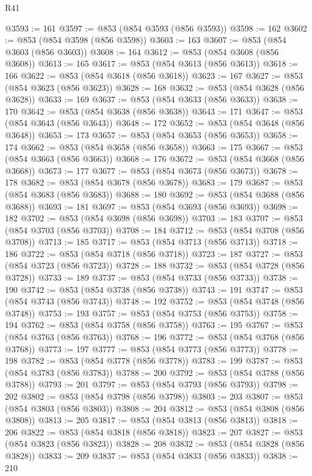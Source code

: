 \begin{lexlean}{R41}
\begin{coremodule}
@3593 := 161
@3597 := @853 (@854 @3593 (@856 @3593))
@3598 := 162
@3602 := @853 (@854 @3598 (@856 @3598))
@3603 := 163
@3607 := @853 (@854 @3603 (@856 @3603))
@3608 := 164
@3612 := @853 (@854 @3608 (@856 @3608))
@3613 := 165
@3617 := @853 (@854 @3613 (@856 @3613))
@3618 := 166
@3622 := @853 (@854 @3618 (@856 @3618))
@3623 := 167
@3627 := @853 (@854 @3623 (@856 @3623))
@3628 := 168
@3632 := @853 (@854 @3628 (@856 @3628))
@3633 := 169
@3637 := @853 (@854 @3633 (@856 @3633))
@3638 := 170
@3642 := @853 (@854 @3638 (@856 @3638))
@3643 := 171
@3647 := @853 (@854 @3643 (@856 @3643))
@3648 := 172
@3652 := @853 (@854 @3648 (@856 @3648))
@3653 := 173
@3657 := @853 (@854 @3653 (@856 @3653))
@3658 := 174
@3662 := @853 (@854 @3658 (@856 @3658))
@3663 := 175
@3667 := @853 (@854 @3663 (@856 @3663))
@3668 := 176
@3672 := @853 (@854 @3668 (@856 @3668))
@3673 := 177
@3677 := @853 (@854 @3673 (@856 @3673))
@3678 := 178
@3682 := @853 (@854 @3678 (@856 @3678))
@3683 := 179
@3687 := @853 (@854 @3683 (@856 @3683))
@3688 := 180
@3692 := @853 (@854 @3688 (@856 @3688))
@3693 := 181
@3697 := @853 (@854 @3693 (@856 @3693))
@3698 := 182
@3702 := @853 (@854 @3698 (@856 @3698))
@3703 := 183
@3707 := @853 (@854 @3703 (@856 @3703))
@3708 := 184
@3712 := @853 (@854 @3708 (@856 @3708))
@3713 := 185
@3717 := @853 (@854 @3713 (@856 @3713))
@3718 := 186
@3722 := @853 (@854 @3718 (@856 @3718))
@3723 := 187
@3727 := @853 (@854 @3723 (@856 @3723))
@3728 := 188
@3732 := @853 (@854 @3728 (@856 @3728))
@3733 := 189
@3737 := @853 (@854 @3733 (@856 @3733))
@3738 := 190
@3742 := @853 (@854 @3738 (@856 @3738))
@3743 := 191
@3747 := @853 (@854 @3743 (@856 @3743))
@3748 := 192
@3752 := @853 (@854 @3748 (@856 @3748))
@3753 := 193
@3757 := @853 (@854 @3753 (@856 @3753))
@3758 := 194
@3762 := @853 (@854 @3758 (@856 @3758))
@3763 := 195
@3767 := @853 (@854 @3763 (@856 @3763))
@3768 := 196
@3772 := @853 (@854 @3768 (@856 @3768))
@3773 := 197
@3777 := @853 (@854 @3773 (@856 @3773))
@3778 := 198
@3782 := @853 (@854 @3778 (@856 @3778))
@3783 := 199
@3787 := @853 (@854 @3783 (@856 @3783))
@3788 := 200
@3792 := @853 (@854 @3788 (@856 @3788))
@3793 := 201
@3797 := @853 (@854 @3793 (@856 @3793))
@3798 := 202
@3802 := @853 (@854 @3798 (@856 @3798))
@3803 := 203
@3807 := @853 (@854 @3803 (@856 @3803))
@3808 := 204
@3812 := @853 (@854 @3808 (@856 @3808))
@3813 := 205
@3817 := @853 (@854 @3813 (@856 @3813))
@3818 := 206
@3822 := @853 (@854 @3818 (@856 @3818))
@3823 := 207
@3827 := @853 (@854 @3823 (@856 @3823))
@3828 := 208
@3832 := @853 (@854 @3828 (@856 @3828))
@3833 := 209
@3837 := @853 (@854 @3833 (@856 @3833))
@3838 := 210

\end{coremodule}
\end{lexlean}
